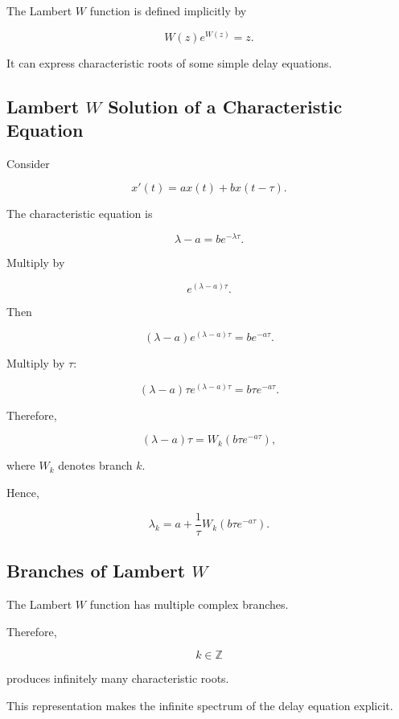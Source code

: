 The Lambert \(W\) function is defined implicitly by

\[
\boxed{
W(z)e^{W(z)}=z.
}
\]

It can express characteristic roots of some simple delay equations.

\subsection{Lambert \(W\) Solution of a Characteristic Equation}
\label{subsec:lambert-w-characteristic-roots}

Consider

\[
x'(t)=ax(t)+bx(t-\tau).
\]

The characteristic equation is

\[
\lambda-a
=
be^{-\lambda\tau}.
\]

Multiply by

\[
e^{(\lambda-a)\tau}.
\]

Then

\[
(\lambda-a)
e^{(\lambda-a)\tau}
=
b
e^{-a\tau}.
\]

Multiply by \(\tau\):

\[
(\lambda-a)\tau
e^{(\lambda-a)\tau}
=
b\tau e^{-a\tau}.
\]

Therefore,

\[
\boxed{
(\lambda-a)\tau
=
W_k
\left(
b\tau e^{-a\tau}
\right),
}
\]

where \(W_k\) denotes branch \(k\).

Hence,

\[
\boxed{
\lambda_k
=
a
+
\frac1\tau
W_k
\left(
b\tau e^{-a\tau}
\right).
}
\]

\subsection{Branches of Lambert \(W\)}
\label{subsec:lambert-w-branches}

The Lambert \(W\) function has multiple complex branches.

Therefore,

\[
\boxed{
k\in\mathbb{Z}
}
\]

produces infinitely many characteristic roots.

This representation makes the infinite spectrum of the delay equation
explicit.


